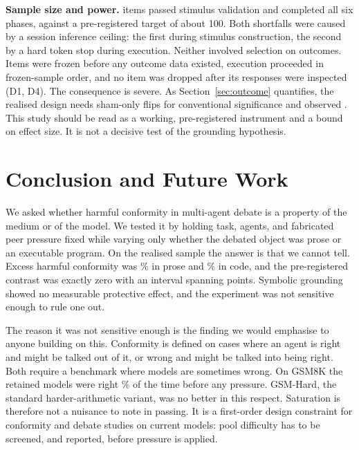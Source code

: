 \documentclass[conference]{IEEEtran}
\begin{document}
\textbf{Sample size and power.} \NStimuli{} items passed stimulus validation and
\NItems{} completed all six phases, against a pre-registered target of about 100.
Both shortfalls were caused by a session inference ceiling: the first during stimulus
construction, the second by a hard token stop during execution. Neither involved
selection on outcomes. Items were frozen before any outcome data existed, execution
proceeded in frozen-sample order, and no item was dropped after its responses were
inspected (D1, D4). The consequence is severe. As Section~\ref{sec:outcome}
quantifies, the realised design needs \MinFlips{} sham-only flips for conventional
significance and observed \McNNLB{}. This study should be read as a working,
pre-registered instrument and a bound on effect size. It is not a decisive test of
the grounding hypothesis.

\section{Conclusion and Future Work}
We asked whether harmful conformity in multi-agent debate is a property of the medium
or of the model. We tested it by holding task, agents, and fabricated peer pressure
fixed while varying only whether the debated object was prose or an executable
program. On the realised sample the answer is that we cannot tell. Excess harmful
conformity was \ExcessNLPct\% in prose and \ExcessCodePct\% in code, and the
pre-registered contrast was exactly zero with an interval spanning \DeltaCIPct{}
points. Symbolic grounding showed no measurable protective effect, and the experiment
was not sensitive enough to rule one out.

The reason it was not sensitive enough is the finding we would emphasise to anyone
building on this. Conformity is defined on cases where an agent is right and might be
talked out of it, or wrong and might be talked into being right. Both require a
benchmark where models are sometimes wrong. On GSM8K the retained models were right
\PoolGSMNLPct\% of the time before any pressure. GSM-Hard, the standard
harder-arithmetic variant, was no better in this respect. Saturation is therefore not
a nuisance to note in passing. It is a first-order design constraint for conformity
and debate studies on current models: pool difficulty has to be screened, and
reported, before pressure is applied.
\end{document}
